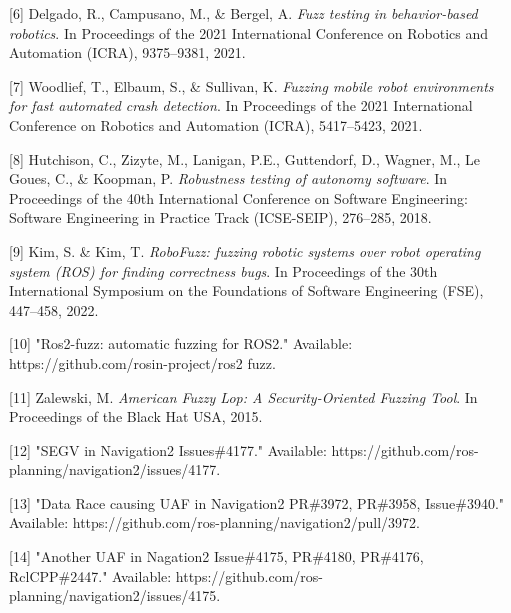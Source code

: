 \documentclass[zihao=-4]{ctexart}
\begin{document}
[6] Delgado, R., Campusano, M., \& Bergel, A. \textit{Fuzz testing in behavior-based robotics}. In Proceedings of the 2021 International Conference on Robotics and Automation (ICRA), 9375–9381, 2021.

[7] Woodlief, T., Elbaum, S., \& Sullivan, K. \textit{Fuzzing mobile robot environments for fast automated crash detection}. In Proceedings of the 2021 International Conference on Robotics and Automation (ICRA), 5417–5423, 2021.

[8] Hutchison, C., Zizyte, M., Lanigan, P.E., Guttendorf, D., Wagner, M., Le Goues, C., \& Koopman, P. \textit{Robustness testing of autonomy software}. In Proceedings of the 40th International Conference on Software Engineering: Software Engineering in Practice Track (ICSE-SEIP), 276–285, 2018.

[9] Kim, S. \& Kim, T. \textit{RoboFuzz: fuzzing robotic systems over robot operating system (ROS) for finding correctness bugs}. In Proceedings of the 30th International Symposium on the Foundations of Software Engineering (FSE), 447–458, 2022.

[10] "Ros2-fuzz: automatic fuzzing for ROS2." Available: https://github.com/rosin-project/ros2 fuzz.

[11] Zalewski, M. \textit{American Fuzzy Lop: A Security-Oriented Fuzzing Tool}. In Proceedings of the Black Hat USA, 2015.

[12] "SEGV in Navigation2 Issues\#4177." Available: https://github.com/ros-planning/navigation2/issues/4177.

[13] "Data Race causing UAF in Navigation2 PR\#3972, PR\#3958, Issue\#3940." Available: https://github.com/ros-planning/navigation2/pull/3972.

[14] "Another UAF in Nagation2 Issue\#4175, PR\#4180, PR\#4176, RclCPP\#2447." Available: https://github.com/ros-planning/navigation2/issues/4175.

% 
\end{document}
